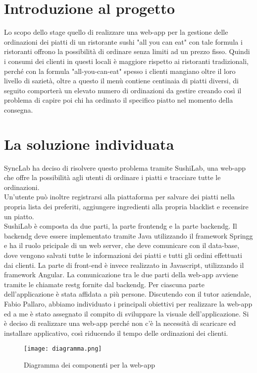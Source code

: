 \section{Introduzione al progetto}
Lo scopo dello stage quello di realizzare una web-app per la gestione delle ordinazioni dei piatti di un ristorante sushi "all you can eat" con tale formula i ristoranti offrono la possibilità di ordinare senza limiti ad un prezzo fisso. Quindi i consumi dei clienti in questi locali è maggiore rispetto ai ristoranti tradizionali, perché con la formula "all-you-can-eat" spesso i clienti mangiano oltre il loro livello di sazietà, oltre a questo il menù contiene centinaia di piatti diversi, di seguito comporterà un elevato numero di ordinazioni da gestire creando così il problema di capire poi chi ha ordinato il specifico piatto nel momento della consegna.

\section{La soluzione individuata}
SyncLab ha deciso di risolvere questo problema tramite SushiLab, una web-app che offre la possibilità agli utenti di ordinare i piatti e tracciare tutte le ordinazioni.\\ 
Un'utente può inoltre registrarsi alla piattaforma per salvare dei piatti nella propria lista dei preferiti, aggiungere ingredienti alla propria blacklist e recensire un piatto.\\
SushiLab è composta da due parti, la parte \gls{frontendg} e la parte \gls{backendg}. Il \gls{backendg} deve essere implementato tramite Java utilizzando il framework \gls{Springg} e ha il ruolo pricipale di un web server, che deve comunicare con il data-base, dove vengono salvati tutte le informazioni dei piatti e tutti gli ordini effettuati dai clienti.
La parte di front-end è invece realizzato in Javascript, utilizzando il framework Angular. La comunicazione tra le due parti della web-app avviene tramite le chiamate \gls{restg} fornite dal \gls{backendg}.
Per ciascuna parte dell'applicazione è stata affidata a più persone. Discutendo con il tutor aziendale, Fabio Pallaro, abbiamo individuato i principali obiettivi per realizzare la web-app ed a me è stato assegnato il compito di sviluppare la visuale dell'applicazione. 
Si è deciso di realizzare una web-app perché non c'è la necessità di scaricare ed installare applicativo, così riducendo il tempo delle ordinazioni dei clienti.

\begin{figure}[H]
    \centering
    \texttt{[image: diagramma.png]}
    \caption{Diagramma dei componenti per la web-app}
\end{figure}



